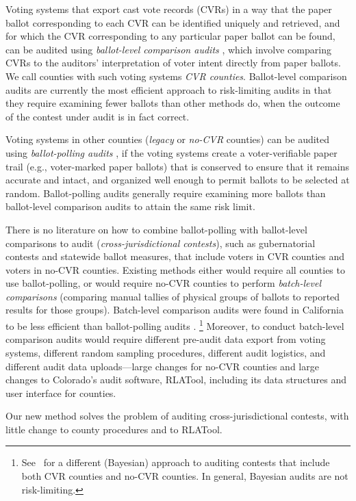 \documentclass[runningheads]{llncs}
\begin{document}
Voting systems that export cast vote records (CVRs) in a way that the paper ballot corresponding to each CVR can be identified uniquely and retrieved, and for which the CVR corresponding to any particular paper ballot can be found, can be audited using \emph{ballot-level comparison audits} \cite{lindemanStark12}, which involve comparing CVRs to the auditors' interpretation of voter intent directly from paper ballots.
We call counties with such voting systems \emph{CVR counties}.
Ballot-level comparison audits are currently the most efficient approach to risk-limiting audits in that they require examining fewer ballots than other methods do, when the outcome of the contest under audit is in fact correct.

Voting systems in other counties (\emph{legacy} or \emph{no-CVR} counties) can be audited using \emph{ballot-polling audits} \cite{lindemanEtal12,lindemanStark12}, if the voting systems create a voter-verifiable paper trail (e.g., voter-marked paper ballots) that is conserved to ensure that it remains accurate and intact, and organized well enough to permit ballots to be selected at random.
Ballot-polling audits generally require examining more ballots than ballot-level comparison audits to attain the same risk limit.

There is no literature on how to combine ballot-polling with ballot-level comparisons to audit (\textit{cross-jurisdictional contests}), such as gubernatorial contests and statewide ballot measures, that include voters in CVR counties and voters in no-CVR counties.
Existing methods either would require all counties to use ballot-polling, or would require no-CVR counties to perform \textit{batch-level comparisons} (comparing manual tallies of physical groups of ballots to reported results for those groups).
Batch-level comparison audits were found in
California to be less efficient than ballot-polling audits \cite{CA_SOS_EAC}.%
\footnote{%
  See~\cite{Rivest-2018-bayesian-tabulation-audits}
  for a different (Bayesian) approach to auditing contests that include both CVR counties
  and no-CVR counties. In general, Bayesian audits are not risk-limiting.
}
Moreover, to conduct batch-level comparison audits would require different pre-audit data export from voting systems, different random sampling procedures, different audit logistics, and different audit data uploads---large changes for no-CVR counties and large changes to Colorado's audit software, RLATool, including its data structures and user interface for counties.

Our new method solves the problem of auditing cross-jurisdictional contests, with little change to county procedures and to RLATool. 
\end{document}
